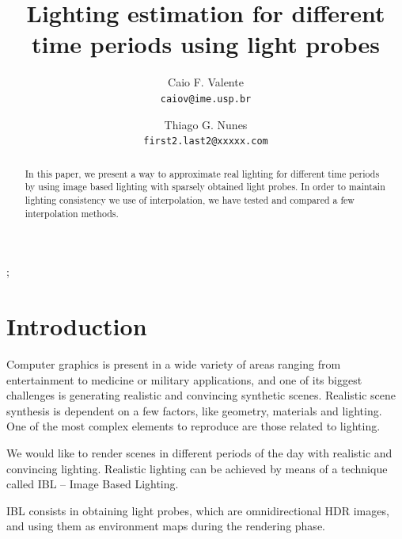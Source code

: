 \documentclass[conference]{acmsiggraph}
\title{Lighting estimation for different time periods using light probes}
\author{
  Caio F. Valente\\
  \texttt{caiov@ime.usp.br}
  \and
  Thiago G. Nunes\\
  \texttt{first2.last2@xxxxx.com}
}
\begin{document}

\maketitle

\begin{abstract}
	In this paper, we present a way to approximate real lighting for different time periods by using image based lighting with sparsely obtained light probes. In order to maintain lighting consistency we use of interpolation, we have tested and compared a few interpolation methods.
\end{abstract}

\begin{CRcatlist}
  ;
\end{CRcatlist}

\keywordlist


\TOGlinkslist


\copyrightspace

\section{Introduction}

	Computer graphics is present in a wide variety of areas ranging from entertainment to medicine or military applications, and one of its biggest challenges is generating realistic and convincing synthetic scenes. Realistic scene synthesis is dependent on a few factors, like geometry, materials and lighting. One of the most complex elements to reproduce are those related to lighting.

	We would like to render scenes in different periods of the day with realistic and convincing lighting. Realistic lighting can be achieved by means of a technique called IBL – Image Based Lighting. 

	IBL consists in obtaining light probes, which are omnidirectional HDR images, and using them as environment maps during the rendering phase.
\end{document}
